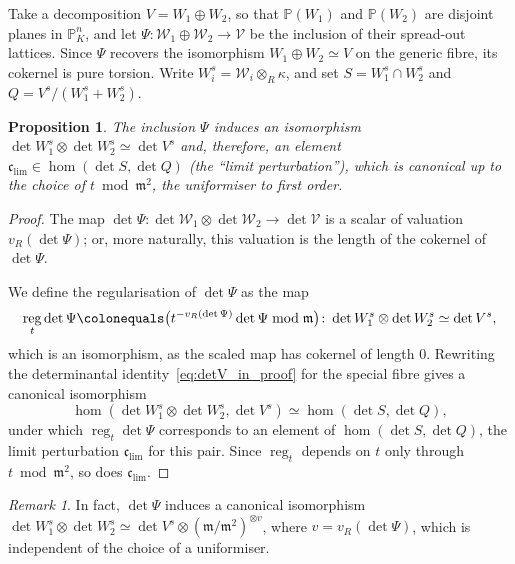 \documentclass[11pt,a4paper]{amsart}
\newcommand{\Pp}{\mathbb{P}}
\newcommand{\pn}{\mathbb{P}^{n}}
\newcommand{\xc}{\mathfrak{c}}
\newcommand{\xm}{\mathfrak{m}}
\DeclareMathOperator{\reg}{reg}
\theoremstyle{plain}
\newtheorem{proposition}[theorem]{Proposition}
\theoremstyle{definition}
\theoremstyle{remark}
\newtheorem{remark}[theorem]{Remark}
\newcommand{\cw}{\mathcal{W}}
\newcommand{\cv}{\mathcal{V}}
\newcommand{\coleq}{\colonequals}
\newcommand{\xci}[1][]{\xc_{\mathrm{lim}#1}} %
\begin{document}
Take a decomposition $V = W_1 \oplus W_2$, so that $\Pp(W_1)$ and $\Pp(W_2)$ are disjoint planes in $\pn_K$, and let $\Psi \colon \cw_1 \oplus \cw_2 \to \cv$ be the inclusion of their spread-out lattices. Since $\Psi$ recovers the isomorphism $W_1 \oplus W_2 \simeq V$ on the generic fibre, its cokernel is pure torsion. Write $W_i^s = \cw_i \otimes_R \kappa$, and set $S = W_1^s \cap W_2^s$ and $Q = V^s/(W_1^s + W_2^s)$.

\begin{proposition}\label{prop:limit-perturbation}
  The inclusion $\Psi$ induces an isomorphism $\det W_1^s \otimes \det W_2^s \simeq \det V^s$ and, therefore, an element $\xci \in \hom(\det S, \det Q)$ (the ``limit perturbation''), which is canonical up to the choice of $t \bmod \xm^2$, the uniformiser to first order.
\end{proposition}

\begin{proof}
  The map $\det \Psi \colon \det \cw_1 \otimes \det \cw_2 \to \det \cv$ is a scalar of valuation $v_R(\det \Psi)$; or, more naturally, this valuation is the length of the cokernel of $\det \Psi$. 

 We define the regularisation of $\det \Psi$ as the map
  \[
    \reg_t \det \Psi \coleq \bigl(t^{-v_R(\det \Psi)} \det \Psi \bmod \xm\bigr) \colon \det W_1^s \otimes \det W_2^s \simeq \det V^s,
  \]
 which is an isomorphism, as the scaled map has cokernel of length $0$. Rewriting the determinantal identity~\eqref{eq:detV_in_proof} for the special fibre gives a canonical isomorphism
  \[
    \hom(\det W_1^s \otimes \det W_2^s, \det V^s) \simeq \hom(\det S, \det Q),
  \]
  under which $\reg_t \det \Psi$ corresponds to an element of $\hom(\det S, \det Q)$, the limit perturbation $\xci$ for this pair. Since $\reg_t$ depends on $t$ only through $t \bmod \xm^2$, so does $\xci$.
\end{proof}

\begin{remark}
  In fact, $\det \Psi$ induces a canonical isomorphism $\det W_1^s \otimes \det W_2^s \simeq \det V^s \otimes (\xm/\xm^2)^{\otimes v}$, where $v = v_R(\det \Psi)$, which is independent of the choice of a uniformiser.
\end{remark}
\end{document}
